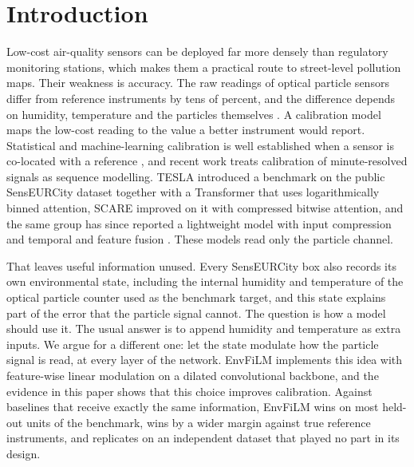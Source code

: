 \documentclass[journal]{IEEEtran}
\begin{document}
\section{Introduction}

Low-cost air-quality sensors can be deployed far more densely than regulatory monitoring stations, which makes them
a practical route to street-level pollution maps. Their weakness is accuracy. The raw readings of optical
particle sensors differ from reference instruments by tens of percent, and the difference depends on humidity,
temperature and the particles themselves \cite{karagulian2019,crilley2018,diantonio2018}. A calibration model maps the
low-cost reading to the value a better instrument would report. Statistical and machine-learning calibration is well
established when a sensor is co-located with a reference \cite{zimmerman2018,malings2019,barkjohn2021,concas2021}, and
recent work treats calibration of minute-resolved signals as sequence modelling. TESLA \cite{ahn2025} introduced a
benchmark on the public SensEURCity dataset \cite{vanpoppel2023} together with a Transformer that uses logarithmically
binned attention, SCARE \cite{yun2025} improved on it with compressed bitwise attention, and the same group has since reported a
lightweight model with input compression and temporal and feature fusion \cite{yun2026}. These models read only
the particle channel.

That leaves useful information unused. Every SensEURCity box also records its own environmental state,
including the internal humidity and temperature of the optical particle counter used as the benchmark target, and this
state explains part of the error that the particle signal cannot. The question is how a model should use it. The usual
answer is to append humidity and temperature as extra inputs. We argue for a different one: let the state modulate how
the particle signal is read, at every layer of the network. EnvFiLM implements this idea with feature-wise linear
modulation on a dilated convolutional backbone, and the evidence in this paper shows that this choice improves calibration. Against
baselines that receive exactly the same information, EnvFiLM wins on most held-out units of the benchmark, wins by a
wider margin against true reference instruments, and replicates on an independent dataset that played no part in its
design.
\end{document}
